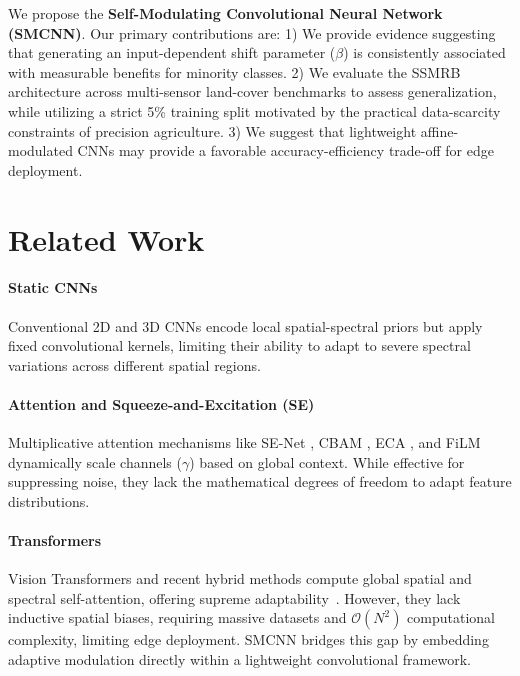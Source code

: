 \documentclass[pdflatex,sn-mathphys-num]{sn-jnl}
\theoremstyle{thmstyleone}
\theoremstyle{thmstyletwo}
\theoremstyle{thmstylethree}
\begin{document}
We propose the \textbf{Self-Modulating Convolutional Neural Network (SMCNN)}. Our primary contributions are:
1) We provide evidence suggesting that generating an input-dependent shift parameter ($\beta$) is consistently associated with measurable benefits for minority classes.
2) We evaluate the SSMRB architecture across multi-sensor land-cover benchmarks to assess generalization, while utilizing a strict 5\% training split motivated by the practical data-scarcity constraints of precision agriculture.
3) We suggest that lightweight affine-modulated CNNs may provide a favorable accuracy-efficiency trade-off for edge deployment.

\section{Related Work}
\paragraph{Static CNNs} Conventional 2D and 3D CNNs \cite{li2017spectral,roy2020hybridsn} encode local spatial-spectral priors but apply fixed convolutional kernels, limiting their ability to adapt to severe spectral variations across different spatial regions.
\paragraph{Attention and Squeeze-and-Excitation (SE)} Multiplicative attention mechanisms like SE-Net \cite{hu2018squeeze}, CBAM \cite{woo2018cbam}, ECA \cite{wang2020eca}, and FiLM \cite{perez2018film} dynamically scale channels ($\gamma$) based on global context. While effective for suppressing noise, they lack the mathematical degrees of freedom to adapt feature distributions.
\paragraph{Transformers} Vision Transformers and recent hybrid methods compute global spatial and spectral self-attention, offering supreme adaptability~\cite{zhao2024sifanet,zhang2025stmnet,li2025ictnet,wang2025mslkacnn,zeng2025hyperspectral,chen2025adaptive,wu2025efficient,zhou2025hyperspectral,zhang2025spatial,sun2025advances}. However, they lack inductive spatial biases, requiring massive datasets and $\mathcal{O}(N^2)$ computational complexity, limiting edge deployment. SMCNN bridges this gap by embedding adaptive modulation directly within a lightweight convolutional framework.
\end{document}
